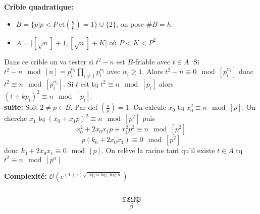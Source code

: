 \documentclass[12pt]{article}
\theoremstyle{plain}
\theoremstyle{definition}
\newcommand{\Or}{\mathcal{O}}
\begin{document}
\noindent \textbf{Crible quadratique:}
\begin{itemize}
    \item $B=\{p| p<P~\text{et}
\left(\frac{n}{p}\right)=1\}\cup\{2\}$, on pose $\#B=h$.
    \item $A=\big[[\sqrt{n}]+1,[\sqrt{n}]+K\big]$ où
$P<K<P^2$.
\end{itemize}
Dans ce crible on va tester si $t^2 - n$ est $B$-friable 
avec $t\in A$. Si $t^2-n\mod[n]=p_i^{\alpha_i}
\prod_{i\ne1}p_l^{\alpha_l}$ avec $\alpha_i\geq 1$. Alors 
$t^2-n\equiv 0 \mod[p_i^{\alpha_i}]$ donc $t^2\equiv n\mod[p_i^{\alpha_i}]$.
Si $t$ est tq $t^2\equiv n\mod[p_i]$ alors $(t+kp_i)^2\equiv n \mod[p_i]$.\\

\noindent \textbf{suite:} Soit $2\ne p\in B$. Par def $\left(\frac{n}{p}\right)=1$.
On calcule $x_0$ tq $x_0^2\equiv n\mod[p]$. On cherche 
$x_1$ tq $(x_0+x_1p)^2\equiv n\mod[p^2]$ puis 
\[
    x_0^2+2x_0x_1p+x_1^2p^2\equiv n\mod[p^2]
\]
\[
    p(k_0+2x_0x_1)\equiv0\mod[p^2]
\]
donc $k_0+2x_0x_1\equiv 0\mod[p]$. On relève la racine 
tant qu'il existe $t\in A$ tq $t^2\equiv n\mod[p^{\alpha}]$

\textbf{Complexité:} \(\Or(e^{(1+\epsilon)\sqrt{\log n \log\log n}})\)

\subsection{}

\[\mathfrak{TEUP}\]
\[\beta\]
\end{document}
